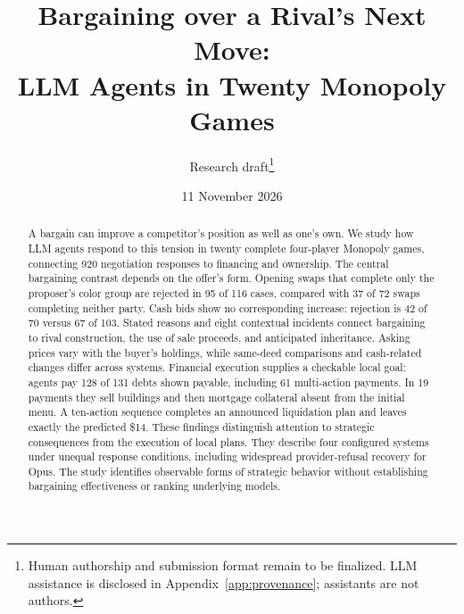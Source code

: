 \documentclass[11pt,letterpaper]{article}
\title{Bargaining over a Rival's Next Move:\\LLM Agents in Twenty Monopoly Games}
\author{Research draft\thanks{Human authorship and submission format remain to be finalized. LLM assistance is disclosed in Appendix~\ref{app:provenance}; assistants are not authors.}}
\date{11 November 2026}
\begin{document}




\maketitle
\begin{abstract}
A bargain can improve a competitor's position as well as one's own. We study how LLM agents respond to this tension in twenty complete four-player Monopoly games, connecting 920 negotiation responses to financing and ownership. The central bargaining contrast depends on the offer's form. Opening swaps that complete only the proposer's color group are rejected in 95 of 116 cases, compared with 37 of 72 swaps completing neither party. Cash bids show no corresponding increase: rejection is 42 of 70 versus 67 of 103. Stated reasons and eight contextual incidents connect bargaining to rival construction, the use of sale proceeds, and anticipated inheritance. Asking prices vary with the buyer's holdings, while same-deed comparisons and cash-related changes differ across systems. Financial execution supplies a checkable local goal: agents pay 128 of 131 debts shown payable, including 61 multi-action payments. In 19 payments they sell buildings and then mortgage collateral absent from the initial menu. A ten-action sequence completes an announced liquidation plan and leaves exactly the predicted \$14. These findings distinguish attention to strategic consequences from the execution of local plans. They describe four configured systems under unequal response conditions, including widespread provider-refusal recovery for Opus. The study identifies observable forms of strategic behavior without establishing bargaining effectiveness or ranking underlying models.
\end{abstract}






\begingroup\small\setlength{\bibsep}{0pt}

\endgroup
\clearpage\appendix

\end{document}
